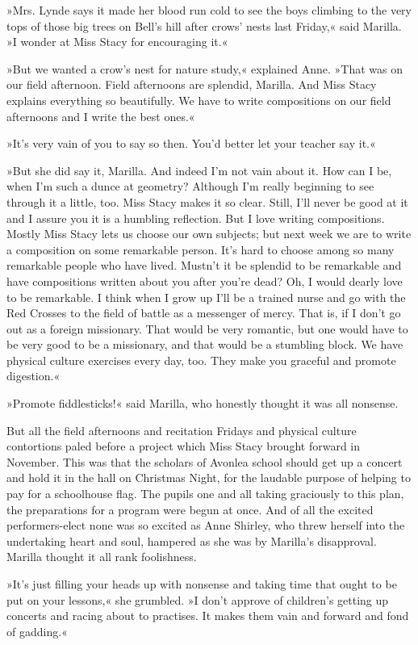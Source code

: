 »Mrs. Lynde says it made her blood run cold to see the boys climbing to the very tops of those big trees on Bell's hill after crows' nests last Friday,« said Marilla. »I wonder at Miss Stacy for encouraging it.«

»But we wanted a crow's nest for nature study,« explained Anne. »That was on our field afternoon. Field afternoons are splendid, Marilla. And Miss Stacy explains everything so beautifully. We have to write compositions on our field afternoons and I write the best ones.«

»It's very vain of you to say so then. You'd better let your teacher say it.«

»But she did say it, Marilla. And indeed I'm not vain about it. How can I be, when I'm such a dunce at geometry? Although I'm really beginning to see through it a little, too. Miss Stacy makes it so clear. Still, I'll never be good at it and I assure you it is a humbling reflection. But I love writing compositions. Mostly Miss Stacy lets us choose our own subjects; but next week we are to write a composition on some remarkable person. It's hard to choose among so many remarkable people who have lived. Mustn't it be splendid to be remarkable and have compositions written about you after you're dead? Oh, I would dearly love to be remarkable. I think when I grow up I'll be a trained nurse and go with the Red Crosses to the field of battle as a messenger of mercy. That is, if I don't go out as a foreign missionary. That would be very romantic, but one would have to be very good to be a missionary, and that would be a stumbling block. We have physical culture exercises every day, too. They make you graceful and promote digestion.«

»Promote fiddlesticks!« said Marilla, who honestly thought it was all nonsense.

But all the field afternoons and recitation Fridays and physical culture contortions paled before a project which Miss Stacy brought forward in November. This was that the scholars of Avonlea school should get up a concert and hold it in the hall on Christmas Night, for the laudable purpose of helping to pay for a schoolhouse flag. The pupils one and all taking graciously to this plan, the preparations for a program were begun at once. And of all the excited performers-elect none was so excited as Anne Shirley, who threw herself into the undertaking heart and soul, hampered as she was by Marilla's disapproval. Marilla thought it all rank foolishness.

»It's just filling your heads up with nonsense and taking time that ought to be put on your lessons,« she grumbled. »I don't approve of children's getting up concerts and racing about to practises. It makes them vain and forward and fond of gadding.«

